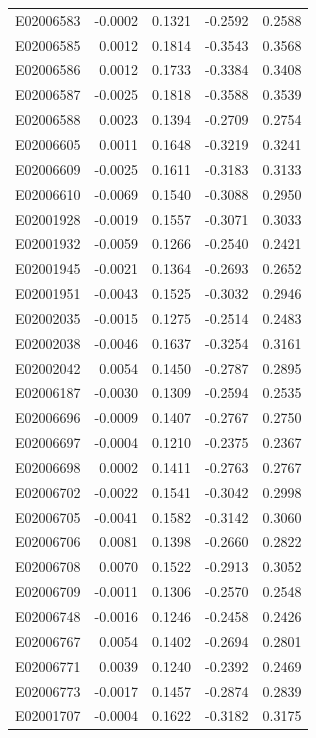 \documentclass[11pt, a4paper]{article}
\begin{document}
\begin{longtable}{lrrrr}
E02006583 & -0.0002 & 0.1321 & -0.2592 & 0.2588 \\
E02006585 & 0.0012 & 0.1814 & -0.3543 & 0.3568 \\
E02006586 & 0.0012 & 0.1733 & -0.3384 & 0.3408 \\
E02006587 & -0.0025 & 0.1818 & -0.3588 & 0.3539 \\
E02006588 & 0.0023 & 0.1394 & -0.2709 & 0.2754 \\
E02006605 & 0.0011 & 0.1648 & -0.3219 & 0.3241 \\
E02006609 & -0.0025 & 0.1611 & -0.3183 & 0.3133 \\
E02006610 & -0.0069 & 0.1540 & -0.3088 & 0.2950 \\
E02001928 & -0.0019 & 0.1557 & -0.3071 & 0.3033 \\
E02001932 & -0.0059 & 0.1266 & -0.2540 & 0.2421 \\
E02001945 & -0.0021 & 0.1364 & -0.2693 & 0.2652 \\
E02001951 & -0.0043 & 0.1525 & -0.3032 & 0.2946 \\
E02002035 & -0.0015 & 0.1275 & -0.2514 & 0.2483 \\
E02002038 & -0.0046 & 0.1637 & -0.3254 & 0.3161 \\
E02002042 & 0.0054 & 0.1450 & -0.2787 & 0.2895 \\
E02006187 & -0.0030 & 0.1309 & -0.2594 & 0.2535 \\
E02006696 & -0.0009 & 0.1407 & -0.2767 & 0.2750 \\
E02006697 & -0.0004 & 0.1210 & -0.2375 & 0.2367 \\
E02006698 & 0.0002 & 0.1411 & -0.2763 & 0.2767 \\
E02006702 & -0.0022 & 0.1541 & -0.3042 & 0.2998 \\
E02006705 & -0.0041 & 0.1582 & -0.3142 & 0.3060 \\
E02006706 & 0.0081 & 0.1398 & -0.2660 & 0.2822 \\
E02006708 & 0.0070 & 0.1522 & -0.2913 & 0.3052 \\
E02006709 & -0.0011 & 0.1306 & -0.2570 & 0.2548 \\
E02006748 & -0.0016 & 0.1246 & -0.2458 & 0.2426 \\
E02006767 & 0.0054 & 0.1402 & -0.2694 & 0.2801 \\
E02006771 & 0.0039 & 0.1240 & -0.2392 & 0.2469 \\
E02006773 & -0.0017 & 0.1457 & -0.2874 & 0.2839 \\
E02001707 & -0.0004 & 0.1622 & -0.3182 & 0.3175 \\

\end{longtable}
\end{document}

